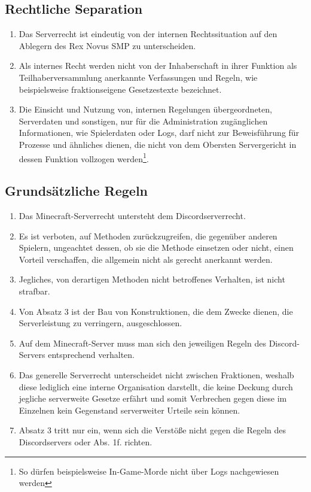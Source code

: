 \documentclass{article}
\begin{document}
\subsection{Rechtliche Separation}
\begin{enumerate}[(1)]
	\item Das Serverrecht ist eindeutig von der internen Rechtssituation auf den Ablegern des Rex Novus SMP zu unterscheiden.
	\item Als internes Recht werden nicht von der Inhaberschaft in ihrer Funktion als Teilhaberversammlung anerkannte Verfassungen und Regeln, wie beispielsweise fraktionseigene Gesetzestexte bezeichnet.
	\item Die Einsicht und Nutzung von, internen Regelungen übergeordneten, Serverdaten und sonstigen, nur für die Administration zugänglichen Informationen, wie Spielerdaten oder Logs, darf nicht zur Beweisführung für Prozesse und ähnliches dienen, die nicht von dem Obersten Servergericht in dessen Funktion vollzogen werden\footnote{So dürfen beispielsweise In-Game-Morde nicht über Logs nachgewiesen werden}.
\end{enumerate}

\subsection{Grundsätzliche Regeln}
\begin{enumerate}[(1)]
	\item Das Minecraft-Serverrecht untersteht dem Discordserverrecht.
	\item Es ist verboten, auf Methoden zurückzugreifen, die gegenüber anderen Spielern, ungeachtet dessen, ob sie die Methode einsetzen oder nicht, einen Vorteil verschaffen, die allgemein nicht als gerecht anerkannt werden.
	\item Jegliches, von derartigen Methoden nicht betroffenes Verhalten, ist nicht strafbar.
	\item Von Absatz 3 ist der Bau von Konstruktionen, die dem Zwecke dienen, die Serverleistung zu verringern, ausgeschlossen.
	\item Auf dem Minecraft-Server muss man sich den jeweiligen Regeln des Discord-Servers entsprechend verhalten.
	\item Das generelle Serverrecht unterscheidet nicht zwischen Fraktionen, weshalb diese lediglich eine interne Organisation darstellt, die keine Deckung durch jegliche serverweite Gesetze erfährt und somit Verbrechen gegen diese im Einzelnen kein Gegenstand serverweiter Urteile sein können.
	\item Absatz 3 tritt nur ein, wenn sich die Verstöße nicht gegen die Regeln des Discordservers oder Abs. 1f. richten.
\end{enumerate}
\end{document}
